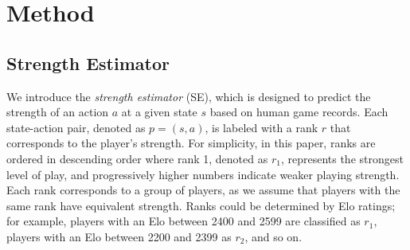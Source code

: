 




\section{Method}
\label{sec:method}

\subsection{Strength Estimator}
\label{subsec:method_strength_estimator}
We introduce the \textit{strength estimator} (SE), which is designed to predict the strength of an action $a$ at a given state $s$ based on human game records.
Each state-action pair, denoted as $p=(s,a)$, is labeled with a rank $r$ that corresponds to the player's strength.
For simplicity, in this paper, ranks are ordered in descending order where rank 1, denoted as $r_1$, represents the strongest level of play, and progressively higher numbers indicate weaker playing strength.
Each rank corresponds to a group of players, as we assume that players with the same rank have equivalent strength.
Ranks could be determined by Elo ratings; for example, players with an Elo between 2400 and 2599 are classified as $r_1$, players with an Elo between 2200 and 2399 as $r_2$, and so on.

